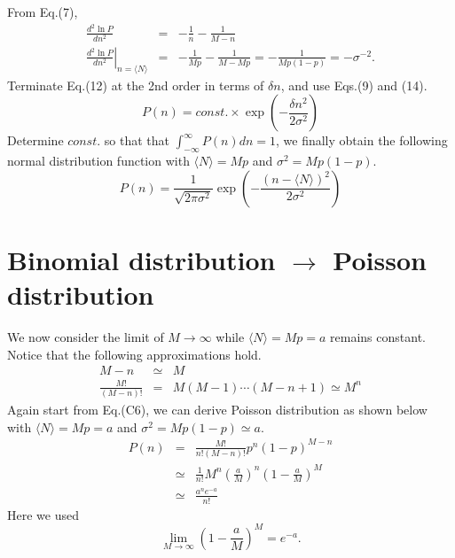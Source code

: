 \documentclass[a4paper,11pt]{article}
\begin{document}
From Eq.(7),
\begin{eqnarray}
  \frac{d^2 \ln P}{dn^2}&=&-\frac{1}{n}-\frac{1}{M-n}\\
  \left.\frac{d^2 \ln P}{dn^2}\right|_{n=\langle N\rangle}&=&-\frac{1}{Mp}-\frac{1}{M-Mp}=-\frac{1}{Mp(1-p)}=-\sigma^{-2}.
\end{eqnarray}
Terminate Eq.(12) at the 2nd order in terms of  $\delta n$, and use Eqs.(9) and (14).
\begin{equation}
P(n)=const.\times\exp\left(-\frac{\delta n^2}{2\sigma^2}\right)
\end{equation}
Determine $const.$ so that that $\int_{-\infty}^{\infty}P(n)dn=1$, we finally obtain the following normal distribution function with $\langle N\rangle=Mp$ and $\sigma^2=Mp(1-p)$.
\begin{equation}
P(n)=\frac{1}{\sqrt{2\pi\sigma^2}}\exp\left(-\frac{(n-\langle N\rangle)^2}{2\sigma^2}\right)
\end{equation}

\section{Binomial distribution $\rightarrow$ Poisson distribution}

We now consider the limit of $M\rightarrow\infty$ while $\langle N\rangle=Mp=a$ remains constant.
Notice that the following approximations hold.
\begin{eqnarray}
M-n&\simeq& M\\
  \frac{M!}{(M-n)!}&=&M(M-1)\cdots(M-n+1)\simeq M^n
\end{eqnarray}
Again start from Eq.(C6), we can derive Poisson distribution as shown below
with $\langle N\rangle=Mp=a$ and $\sigma^2=Mp(1-p)\simeq a$.
\begin{eqnarray}
  P(n)&=&\frac{M!}{n!(M-n)!}p^n(1-p)^{M-n}\\
  &\simeq&\frac{1}{n!}M^n\left(\frac{a}{M}\right)^n\left(1-\frac{a}{M}\right)^M\\
  &\simeq&\frac{a^n e^{-a}}{n!}
\end{eqnarray}
Here we used
\begin{equation}
\lim_{M\rightarrow \infty}\left(1-\frac{a}{M}\right)^M= e^{-a}.
\end{equation}
\end{document}
